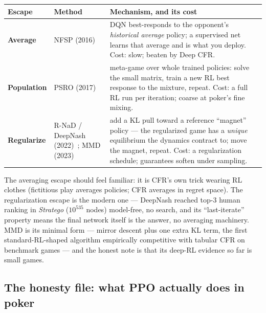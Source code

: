 \begin{center}
\footnotesize
\begin{tabular}{@{}p{0.62in}p{1.02in}p{2.86in}@{}}
\toprule
Escape & Method & Mechanism, and its cost \\
\midrule
\textbf{Average} & NFSP (2016)~\cite{nfsp} & DQN best-responds to the opponent's \emph{historical average} policy; a supervised net learns that average and is what you deploy. Cost: slow; beaten by Deep CFR. \\
\textbf{Population} & PSRO (2017)~\cite{psro} & meta-game over whole trained policies: solve the small matrix, train a new RL best response to the mixture, repeat. Cost: a full RL run per iteration; coarse at poker's fine mixing. \\
\textbf{Regularize} & R-NaD / DeepNash (2022)~\cite{deepnash}; MMD (2023)~\cite{mmd} & add a KL pull toward a reference ``magnet'' policy --- the regularized game has a \emph{unique} equilibrium the dynamics contract to; move the magnet, repeat. Cost: a regularization schedule; guarantees soften under sampling. \\
\bottomrule
\end{tabular}
\end{center}

The averaging escape should feel familiar: it is CFR's own trick wearing RL clothes (fictitious play averages policies; CFR averages in regret space). The regularization escape is the modern one --- DeepNash reached top-3 human ranking in \emph{Stratego} ($10^{535}$ nodes) model-free, no search, and its ``last-iterate'' property means the final network itself is the answer, no averaging machinery. MMD is its minimal form --- mirror descent plus one extra KL term, the first standard-RL-shaped algorithm empirically competitive with tabular CFR on benchmark games --- and the honest note is that its deep-RL evidence so far is small games. 

\subsection*{The honesty file: what PPO actually does in poker}

